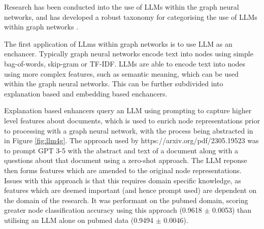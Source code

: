 \documentclass[../main.tex]{subfiles}
\begin{document}
    Research has been conducted into the use of LLMs within the graph neural networks, and has developed a robust taxonomy for categorising the use of LLMs within graph networks \cite{llm4g}. 
    
    The first application of LLms within graph networks is to use LLM as an enchancer. Typically graph neural networks encode text into nodes using simple bag-of-words, skip-gram or TF-IDF. LLMs are able to encode text into nodes using more complex features, such as semantic meaning, which can be used within the graph neural networks. This can be further subdivided into explanation based and embedding based enchancers. 
    
    Explanation based enhancers query an LLM using prompting to capture higher level features about documents, which is used to enrich node representations prior to processing with a graph neural network, with the process being abstracted in in Figure \ref{fig:llm4g}. The approach used by https://arxiv.org/pdf/2305.19523 was to prompt GPT 3-5 with the abstract and text of a document along with a questions about that document using a zero-shot approach. The LLM reponse then forms features which are amended to the original node representations. Issues with this approach is that this requires domain specific knowledge, as features which are deemed important (and hence prompt used) are dependent on the domain of the research. It was performant on the pubmed domain, scoring greater node classification accuracy using this approach (0.9618 $\pm$ 0.0053) than utilising an LLM alone on pubmed data (0.9494 $\pm$ 0.0046).   
\end{document}
